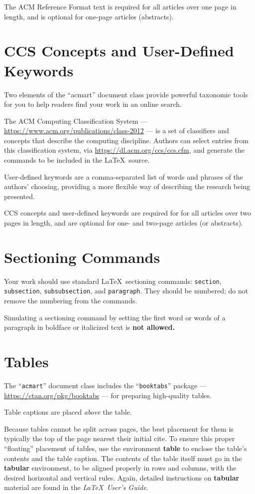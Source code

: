 \documentclass[sigplan,screen]{acmart}
\begin{document}
The ACM Reference Format text is required for all articles over one
page in length, and is optional for one-page articles (abstracts).

\section{CCS Concepts and User-Defined Keywords}

Two elements of the ``acmart'' document class provide powerful
taxonomic tools for you to help readers find your work in an online
search.

The ACM Computing Classification System ---
\url{https://www.acm.org/publications/class-2012} --- is a set of
classifiers and concepts that describe the computing
discipline. Authors can select entries from this classification
system, via \url{https://dl.acm.org/ccs/ccs.cfm}, and generate the
commands to be included in the \LaTeX\ source.

User-defined keywords are a comma-separated list of words and phrases
of the authors' choosing, providing a more flexible way of describing
the research being presented.

CCS concepts and user-defined keywords are required for for all
articles over two pages in length, and are optional for one- and
two-page articles (or abstracts).

\section{Sectioning Commands}

Your work should use standard \LaTeX\ sectioning commands:
\verb|section|, \verb|subsection|, \verb|subsubsection|, and
\verb|paragraph|. They should be numbered; do not remove the numbering
from the commands.

Simulating a sectioning command by setting the first word or words of
a paragraph in boldface or italicized text is {\bfseries not allowed.}

\section{Tables}

The ``\verb|acmart|'' document class includes the ``\verb|booktabs|''
package --- \url{https://ctan.org/pkg/booktabs} --- for preparing
high-quality tables.

Table captions are placed {\itshape above} the table.

Because tables cannot be split across pages, the best placement for
them is typically the top of the page nearest their initial cite.  To
ensure this proper ``floating'' placement of tables, use the
environment \textbf{table} to enclose the table's contents and the
table caption.  The contents of the table itself must go in the
\textbf{tabular} environment, to be aligned properly in rows and
columns, with the desired horizontal and vertical rules.  Again,
detailed instructions on \textbf{tabular} material are found in the
\textit{\LaTeX\ User's Guide}.
\end{document}
